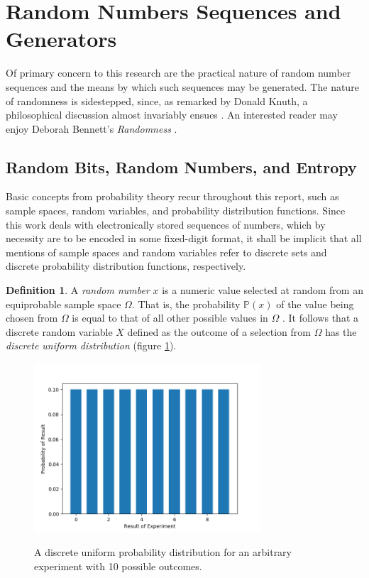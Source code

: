 \documentclass[12pt, titlepage]{report}
\theoremstyle{definition}
\newtheorem{definition}{Definition}
\begin{document}
\section{Random Numbers Sequences and Generators}
Of primary concern to this research are the practical nature of random number sequences and the means by which such sequences may be generated. The nature of randomness is sidestepped, since, as remarked by Donald Knuth, a philosophical discussion almost invariably ensues \cite[p. 2]{donald1998art}. An interested reader may enjoy Deborah Bennett's \textit{Randomness} \cite{bennett2009randomness}.

\subsection{Random Bits, Random Numbers, and Entropy}
Basic concepts from probability theory recur throughout this report, such as sample spaces, random variables, and probability distribution functions. Since this work deals with electronically stored sequences of numbers, which by necessity are to be encoded in some fixed-digit format, it shall be implicit that all mentions of sample spaces and random variables refer to discrete sets and discrete probability distribution functions, respectively.

\begin{definition}
A \emph{random number} $x$ is a numeric value selected at random from an equiprobable sample space $\Omega$. That is, the probability $\mathbb{P}(x)$ of the value being chosen from $\Omega$ is equal to that of all other possible values in $\Omega$ \cite[p. 7]{barker2007recommendation} \cite[s. 1.1.1]{rukhin2001statistical}. It follows that a discrete random variable $X$ defined as the outcome of a selection from $\Omega$ has the \emph{discrete uniform distribution} (figure \ref{figure:uniform_distribution}).
\end{definition}

\begin{figure}
\centering
\includegraphics[width=0.75\textwidth]{img/uniform.png}\\
\caption{A discrete uniform probability distribution for an arbitrary experiment with 10 possible outcomes.}
\label{figure:uniform_distribution}
\end{figure}
\end{document}
